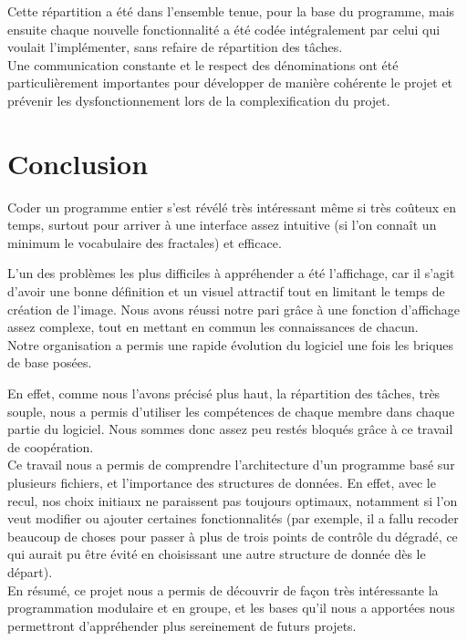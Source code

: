 \documentclass[a4paper,11pt]{article} \usepackage[T1]{fontenc} \usepackage[utf8]{inputenc} \usepackage[francais]{babel}
\begin{document}
Cette répartition a été dans l'ensemble tenue, pour la base du programme, mais ensuite chaque nouvelle fonctionnalité a été codée intégralement par celui qui voulait l'implémenter, sans refaire de répartition des tâches.\\

Une communication constante et le respect des dénominations ont été particulièrement importantes pour développer de manière cohérente le projet et prévenir les dysfonctionnement lors de la complexification du projet.


\section{Conclusion}
Coder un programme entier s'est révélé très intéressant même si très coûteux en temps, surtout pour arriver à une interface assez intuitive (si l'on connaît un minimum le vocabulaire des fractales) et efficace.

L'un des problèmes les plus difficiles à appréhender a été l'affichage, car il s'agit d'avoir une bonne définition et un visuel attractif tout en limitant le temps de création de l'image. Nous avons réussi notre pari grâce à une fonction d'affichage assez complexe, tout en mettant en commun les connaissances de chacun.\\

Notre organisation a permis une rapide évolution du logiciel une fois les briques de base posées.

En effet, comme nous l'avons précisé plus haut, la répartition des tâches, très souple, nous a permis d'utiliser les compétences de chaque membre dans chaque partie du logiciel. Nous sommes donc assez peu restés bloqués grâce à ce travail de coopération.\\

Ce travail nous a permis de comprendre l'architecture d'un programme basé sur plusieurs fichiers, et l'importance des structures de données. En effet, avec le recul, nos choix initiaux ne paraissent pas toujours optimaux, notamment si l'on veut modifier ou ajouter certaines fonctionnalités (par exemple, il a fallu recoder beaucoup de choses pour passer à plus de trois points de contrôle du dégradé, ce qui aurait pu être évité en choisissant une autre structure de donnée dès le départ).\\

En résumé, ce projet nous a permis de découvrir de façon très intéressante la programmation modulaire et en groupe, et les bases qu'il nous a apportées nous permettront d'appréhender plus sereinement de futurs projets.
\end{document}
